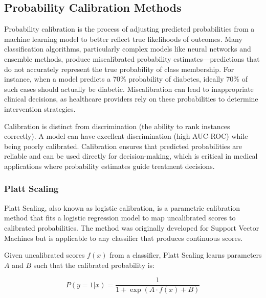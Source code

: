 
\subsection{Probability Calibration Methods}

Probability calibration is the process of adjusting predicted probabilities from a machine learning model to better reflect true likelihoods of outcomes. Many classification algorithms, particularly complex models like neural networks and ensemble methods, produce miscalibrated probability estimates—predictions that do not accurately represent the true probability of class membership. For instance, when a model predicts a 70\% probability of diabetes, ideally 70\% of such cases should actually be diabetic. Miscalibration can lead to inappropriate clinical decisions, as healthcare providers rely on these probabilities to determine intervention strategies.

Calibration is distinct from discrimination (the ability to rank instances correctly). A model can have excellent discrimination (high AUC-ROC) while being poorly calibrated. Calibration ensures that predicted probabilities are reliable and can be used directly for decision-making, which is critical in medical applications where probability estimates guide treatment decisions.

\subsubsection{Platt Scaling}

Platt Scaling, also known as logistic calibration, is a parametric calibration method that fits a logistic regression model to map uncalibrated scores to calibrated probabilities. The method was originally developed for Support Vector Machines but is applicable to any classifier that produces continuous scores.

Given uncalibrated scores $f(x)$ from a classifier, Platt Scaling learns parameters $A$ and $B$ such that the calibrated probability is:

$$P(y=1|x) = \frac{1}{1 + \exp(A \cdot f(x) + B)}$$

